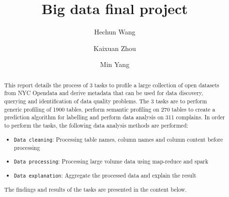 \documentclass[sigconf]{acmart}
\begin{document}
\title{Big data final project}

\author{Hechun Wang}

\author{Kaixuan Zhou}

\author{Min Yang}


\begin{abstract}
This report details the process of 3 tasks to profile a large collection of open datasets from NYC Opendata and derive metadata that can be used for data discovery, querying and identification of data quality problems. The 3 tasks are to perform generic profiling of 1900 tables, perform semantic profiling on 270 tables to create a prediction algorithm for labelling and perform data analysis on 311 complains.
In order to perform the tasks, the following data analysis methods are performed:
\begin{itemize}
\item {\verb|Data cleaning|}: Processing table names, column names and column content before processing
\item {\verb|Data processing|}: Processing large volume data using map-reduce and spark
\item {\verb|Data explanation|}: Aggregate the processed data and explain the result
\end{itemize}
The findings and results of the tasks are presented in the content below. 
\end{abstract}



\maketitle
\end{document}
